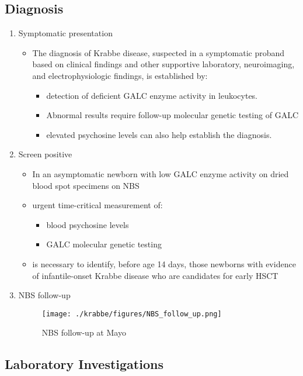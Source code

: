 \documentclass{scrartcl}
\begin{document}
\subsection{Diagnosis}
\label{sec:orgf231d90}
\begin{enumerate}
\item Symptomatic presentation
\label{sec:orgb986b7a}
\begin{itemize}
\item The diagnosis of Krabbe disease, suspected in a symptomatic proband
based on clinical findings and other supportive laboratory,
neuroimaging, and electrophysiologic findings, is established by:
\begin{itemize}
\item detection of deficient GALC enzyme activity in leukocytes.
\item Abnormal results require follow-up molecular genetic testing of GALC
\item elevated psychosine levels can also help establish the diagnosis.
\end{itemize}
\end{itemize}

\item Screen positive
\label{sec:orga64bea7}
\begin{itemize}
\item In an asymptomatic newborn with low GALC enzyme activity
on dried blood spot specimens on NBS
\item urgent time-critical measurement of:
\begin{itemize}
\item blood psychosine levels
\item GALC molecular genetic testing
\end{itemize}
\item is necessary to identify, before age 14 days, those newborns with
evidence of infantile-onset Krabbe disease who are candidates for
early HSCT
\end{itemize}

\item NBS follow-up
\label{sec:orgab0ea5a}

\begin{figure}[htbp]
\centering
\texttt{[image: ./krabbe/figures/NBS\_follow\_up.png]}
\caption{\label{fig:org5dfd349}
NBS follow-up at Mayo}
\end{figure}
\end{enumerate}


\subsection{Laboratory Investigations}
\label{sec:org61852c2}
\end{document}
